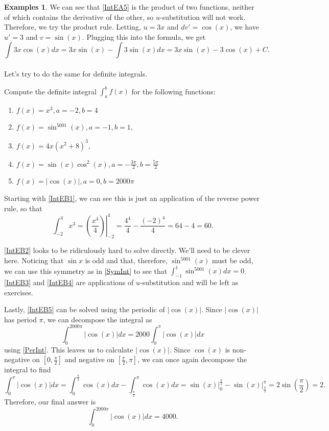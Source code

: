 \documentclass[12pt]{article}
\newcommand{\abs}[1]{ \left| #1 \right| }
\newcommand{\eval}[1]{ \left. #1 \right| }
\theoremstyle{definition}
\newtheorem{exmps}[thm]{Examples}
\theoremstyle{plain}
\numberwithin{equation}{section}
\begin{document}
\begin{exmps}
We can see that \ref{IntEA5} is the product of two functions, neither of which contains the derivative of the other, so $u$-substitution will not work. Therefore, we try the product rule. Letting, $u=3x$ and $dv'=\cos(x)$, we have $u'=3$ and $v=\sin(x)$. Plugging this into the formula, we get
\[
\int 3x\cos(x)dx= 3x\sin(x)-\int 3\sin(x)dx=3x\sin(x)-3\cos(x)+C.
\]
\\

Let's try to do the same for definite integrals.

Compute the definite integral $\int_{a}^{b} f(x)$ for the following functions:
\begin{enumerate}[label=\textbf{Example B.\arabic*.}]
  \addtolength{\itemindent}{1.625cm} %
  \item \label{IntEB1} $f(x)=x^3, a=-2, b=4$
  \item \label{IntEB2} $f(x)=\sin^{5001}(x), a=-1, b=1$, %
  \item \label{IntEB3} $f(x)=4x(x^2+8)^3$,               %
  \item \label{IntEB4} $f(x)=\sin(x)\cos^2(x), a=-\frac{3\pi}{2},b=\frac{5\pi}{2}$ %
  \item \label{IntEB5} $f(x)=\abs{\cos(x)}, a=0, b=2000\pi$ %
\end{enumerate}

Starting with \ref{IntEB1}, we can see this is just an application of the reverse power rule, so that
\[
\int_{-2}^{4}x^3=\eval{\left(\frac{x^4}{4}\right)}^{4}_{-2}=\frac{4^4}{4}-\frac{(-2)^4}{4}=64-4=60.
\]

\ref{IntEB2} looks to be ridiculously hard to solve directly. We'll need to be clever here. Noticing that $\sin x$ is odd and that, therefore, $\sin^{5001}(x)$ must be odd, we can use this symmetry as in \cref{SymInt} to see that $\int_{-1}^{1} \sin^{5001}(x)dx=0$.\\


\ref{IntEB3} and \ref{IntEB4} are applications of $u$-substitution and will be left as exercises.

Lastly, \ref{IntEB5} can be solved using the periodic of $\abs{\cos (x)}$. Since $\abs{\cos (x)}$ has period $\pi$, we can decompose the integral as
\[
\int_{0}^{2000\pi}\abs{\cos(x)}dx=2000\int_{0}^{\pi}\abs{\cos(x)}dx
\]
using \cref{PerInt}. This leaves us to calculate $\abs{\cos(x)}$. Since $\cos(x)$ is non-negative on $[0,\frac{\pi}{2}]$ and negative on $[\frac{\pi}{2}, \pi]$, we can once again decompose the integral to find
\[
\int_{0}^{\pi}\abs{\cos(x)}dx= \int_{0}^{\frac{\pi}{2}}\cos(x)dx-\int_{\frac{\pi}{2}}^{\pi}\cos(x)dx=\eval{\sin(x)}_{0}^{\frac{\pi}{2}}-\eval{\sin(x)}_{\frac{\pi}{2}}^{\pi}=2\sin\left(\frac{\pi}{2}\right)=2.
\]
Therefore, our final answer is
\[
\int_{0}^{2000\pi}\abs{\cos(x)}dx=4000.
\]
\end{exmps}
\end{document}
